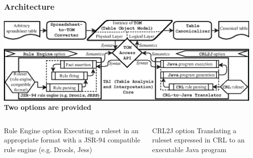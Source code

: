 \documentclass[10pt]{beamer}
\begin{document}


\begin{frame}
\frametitle{Architecture}
\includegraphics[width=1.0\linewidth]{architecture}
\hspace*{\fill} \textbf{Two options are provided} \hspace*{\fill}
\begin{columns}
\begin{block}{\small Rule Engine option}
\small Executing a ruleset in an appropriate format with a JSR-94 compatible rule engine (e.g. Drools, Jess)
\end{block}
\begin{block}{\small CRL2J option}
\small Translating a ruleset expressed in CRL to an executable Java program
\end{block}
\end{columns}
\end{frame}
\end{document}
